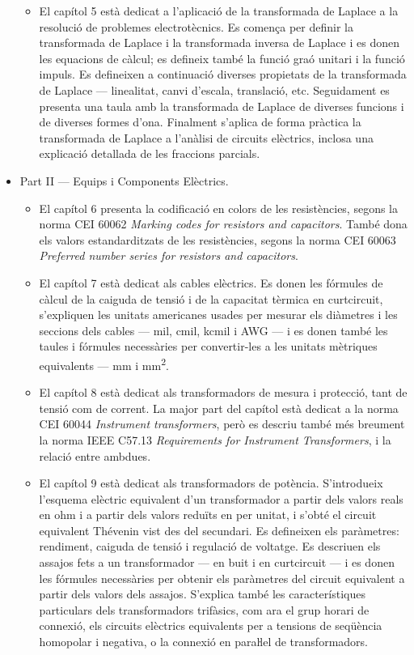 \begin{itemize}
\begin{itemize}
			\item El capítol 5  està dedicat a l'aplicació de la transformada de Laplace a la resolució de problemes electrotècnics. Es comença per definir la transformada de Laplace i la transformada inversa de Laplace i es donen les equacions de càlcul; es defineix també la funció graó  unitari i la funció impuls. Es defineixen a continuació diverses propietats de la transformada de Laplace --- linealitat, canvi d'escala, translació, etc. Seguidament es presenta una taula amb la transformada de Laplace de diverses funcions i de diverses formes d'ona. Finalment s'aplica de forma pràctica la transformada de Laplace a l'anàlisi de circuits elèctrics, inclosa una explicació detallada de les fraccions parcials.
		\end{itemize}
		\item Part II --- Equips i Components Elèctrics. 
		\begin{itemize}
			\item El capítol 6 presenta  la codificació en colors de les resistències, segons la norma CEI 60062 \textit{Marking codes for resistors and capacitors}. També dona els valors estandarditzats de les resistències, segons la norma CEI 60063 \textit{Preferred number series for resistors and capacitors}.
			\item El capítol 7 està dedicat als cables elèctrics. Es donen les fórmules de càlcul de la caiguda de tensió i de la capacitat tèrmica en curtcircuit, s'expliquen  les unitats americanes usades per mesurar els diàmetres i les seccions dels cables --- mil, cmil, kcmil i AWG --- i es donen també les taules i fórmules necessàries per convertir-les a les  unitats mètriques equivalents --- mm i \unit{mm^2}.
			\item El capítol 8 està dedicat als transformadors de mesura i protecció, tant de tensió com de corrent. La major part del capítol està dedicat a la norma CEI 60044 \textit{Instrument transformers}, però es descriu també més breument  la norma IEEE C57.13 	\textit{	Requirements for Instrument Transformers}, i la relació entre ambdues.
			\item El capítol 9 està dedicat als transformadors de potència. S'introdueix l'esquema elèctric equivalent d'un transformador a partir dels valors reals en  ohm i a partir dels valors reduïts en per unitat, i s'obté el circuit equivalent Thévenin vist des del secundari. Es defineixen els paràmetres: rendiment,  caiguda de tensió i regulació de voltatge. Es descriuen els assajos fets a un transformador  --- en buit i en curtcircuit --- i es donen les fórmules necessàries per obtenir els paràmetres del circuit equivalent a partir dels valors dels assajos. S'explica també les característiques particulars dels transformadors trifàsics, com ara el grup horari de connexió,  els circuits elèctrics equivalents per a tensions de seqüència  homopolar i  negativa, o la connexió en paraŀlel de transformadors.

\end{itemize}
\end{itemize}
